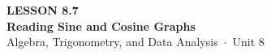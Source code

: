 \documentclass[aspectratio=169, 11pt]{beamer}
\begin{document}
{
\begin{frame}[plain]
  \vspace{2.8cm}\hspace{0.55cm}%
  \begin{minipage}{0.9\textwidth}
    {\color{goldacc}\bfseries\small LESSON 8.7}\\[0.5cm]
    {\color{white}\bfseries\LARGE Reading Sine and Cosine Graphs}\\[1.2cm]
    {\color{mistmid}\small Algebra, Trigonometry, and Data Analysis~$\cdot$~Unit 8}
  \end{minipage}
\end{frame}
}

\begin{frame}[t, plain]
\end{frame}
\end{document}

